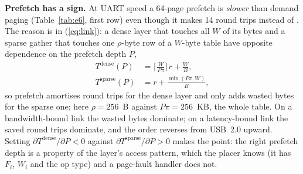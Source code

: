 \documentclass[lettersize,journal]{IEEEtran}
\newcommand{\E}{\textsuperscript{E}}
\begin{document}
\begin{table}[t]\caption{E6 (\E): median latency per inference (ms) across link classes.}\label{tab:e6}\centering\footnotesize
{}\end{table}

\textbf{Prefetch has a sign.} At UART speed a 64-page prefetch is \emph{slower} than demand paging (Table~\ref{tab:e6}, first row) even though it makes 14 round trips instead of \EsixuartoneonefivetwozerozeropoolpfoneFaults. The reason is in (\ref{eq:link}): a dense layer that touches all $W$ of its bytes and a sparse gather that touches one $\rho$-byte row of a $W$-byte table have opposite dependence on the prefetch depth $P$,
\begin{align}
T^{\text{dense}}(P) &= \Big\lceil \frac{W}{P\pi} \Big\rceil r + \frac{W}{B}, \nonumber\\
T^{\text{sparse}}(P) &= r + \frac{\min(P\pi, W)}{B},
\label{eq:prefetch}
\end{align}
so prefetch amortises round trips for the dense layer and only adds wasted bytes for the sparse one; here $\rho = 256$~B against $P\pi = 256$~KB, the whole table. On a bandwidth-bound link the wasted bytes dominate; on a latency-bound link the saved round trips dominate, and the order reverses from USB~2.0 upward. Setting $\partial T^{\text{dense}}/\partial P < 0$ against $\partial T^{\text{sparse}}/\partial P > 0$ makes the point: the right prefetch depth is a property of the layer's access pattern, which the placer knows (it has $F_i$, $W_i$ and the op type) and a page-fault handler does not.
\end{document}
